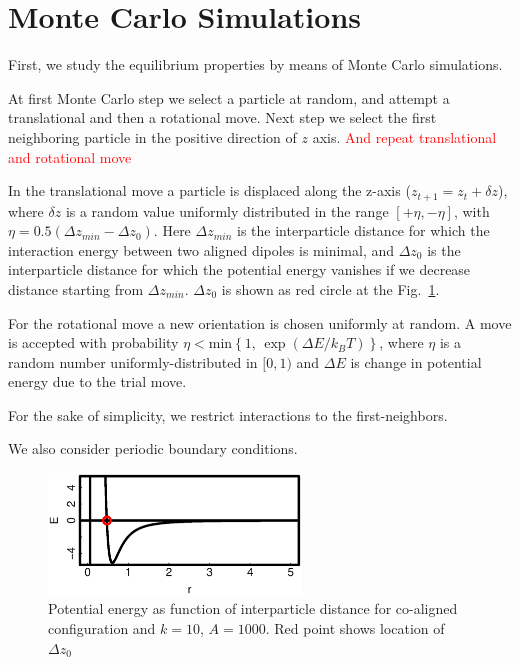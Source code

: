 \section{Monte Carlo Simulations}

First, we study the equilibrium properties by means of Monte Carlo simulations.

At first Monte Carlo step we select a particle at random, and attempt a translational and then a rotational move. Next step we select the first neighboring particle in the positive direction of $z$ axis. \textcolor{red}{And repeat translational and rotational move}

In the translational move a particle is displaced along the z-axis ($z_{t+1} = z_t + \delta z$), where $\delta z$ is a random value uniformly distributed in the range $[+\eta, -\eta]$, with $\eta = 0.5 (\Delta z_{min} - \Delta z_0)$. Here $\Delta z_{min}$ is the interparticle distance for which the interaction energy between two aligned dipoles is minimal, and $\Delta z_0$ is the interparticle distance for which the potential energy vanishes if we decrease distance starting from $\Delta z_{min}$. $\Delta z_0$ is shown as red circle at the Fig.~\ref{fig:delta_z_0_location}.

For the rotational move a new orientation is chosen uniformly at random. A move is accepted with probability $\eta < \mathrm{min} \left\{1, \, \exp(\Delta E / k_BT) \right\}$, where $\eta$ is a random number uniformly-distributed in $[0, 1)$ and $\Delta E$ is change in potential energy due to the trial move.

For the sake of simplicity, we restrict interactions to the first-neighbors.

We also consider periodic boundary conditions.

\begin{figure}
	\centering
	\includegraphics[width=0.6\textwidth]{Images/potential_energy_zero}
	\captionsetup{justification=centering, width=0.9\textwidth}
	\caption{Potential energy as function of interparticle distance for co-aligned configuration and $k = 10$, $A = 1000$. Red point shows location of $\Delta z_0$}
	\label{fig:delta_z_0_location}
\end{figure}